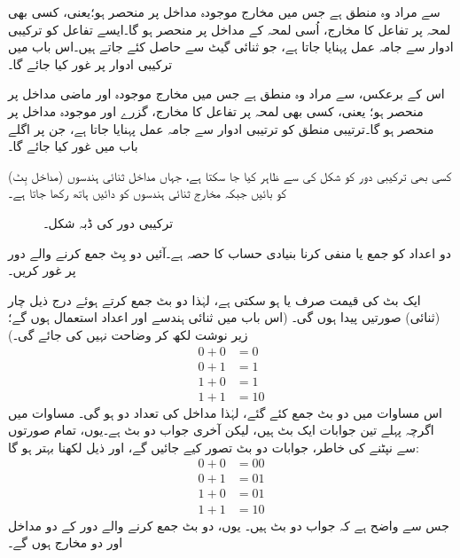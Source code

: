  سے مراد وہ منطق ہے جس میں مخارج موجودہ مداخل پر منحصر ہو؛یعنی، 
 کسی بھی لمحہ پر تفاعل کا مخارج، اُسی لمحہ کے مداخل پر منحصر ہو گا۔ایسے تفاعل کو ترکیبی ادوار سے جامہ عمل پہنایا جاتا ہے، جو ثنائی گیٹ سے حاصل کئے جاتے ہیں۔اس باب میں ترکیبی ادوار پر غور کیا جائے گا۔

اس کے برعکس، سے مراد وہ منطق ہے جس میں مخارج موجودہ اور ماضی مداخل پر منحصر ہو؛ یعنی، کسی بھی لمحہ پر تفاعل کا مخارج، گزرے اور موجودہ مداخل پر منحصر ہو گا۔ترتیبی منطق کو ترتیبی ادوار سے جامہ عمل پہنایا جاتا ہے، جن پر اگلے باب میں غور کیا جائے گا۔

کسی بھی ترکیبی دور کو شکل  کی  سے ظاہر کیا جا سکتا ہے، جہاں مداخل ثنائی ہندسوں (مداخل بِٹ) کو بائیں جبکہ مخارج ثنائی ہندسوں کو دائیں ہاتھ رکھا جاتا ہے۔
\begin{figure}
\centering
{}
\caption{ترکیبی دور کی ڈبہ شکل۔}
\label{شکل_ترکیبی_ڈبہ_دور}
\end{figure}
دو اعداد کو جمع یا منفی کرنا بنیادی حساب کا حصہ ہے۔آئیں دو بِٹ جمع کرنے والے دور پر غور کریں۔

 ایک بٹ کی قیمت صرف  یا  ہو سکتی ہے، لہٰذا دو بٹ جمع کرتے ہوئے درج ذیل چار (ثنائی) صورتیں پیدا ہوں گی۔ (اس باب میں ثنائی ہندسے اور اعداد استعمال ہوں گے؛ زیر نوشت  لکھ کر وضاحت نہیں کی جائے گی۔)
\begin{align*}
0+0&=0\\
0+1&=1\\
1+0&=1\\
1+1&=10
\end{align*}
اس مساوات میں دو بٹ جمع کئے گئے، لہٰذا مداخل کی تعداد دو ہو گی۔ مساوات میں اگرچہ پہلے تین جوابات ایک بٹ ہیں، لیکن آخری جواب دو بٹ ہے۔یوں، تمام صورتوں سے نپٹنے کی خاطر، جوابات دو بٹ تصور کیے جائیں گے، اور ذیل لکھنا بہتر ہو گا:
\begin{align*}
0+0&=00\\
0+1&=01\\
1+0&=01\\
1+1&=10
\end{align*}
جس سے واضح ہے کہ جواب دو بٹ ہیں۔ یوں، دو بٹ جمع کرنے والے دور کے دو مداخل اور دو مخارج ہوں گے۔

